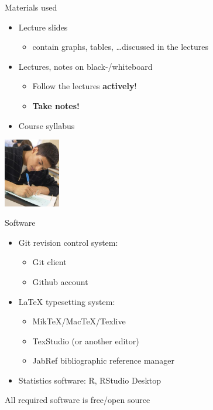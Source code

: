 \documentclass{beamer}
\begin{document}
\begin{frame}{Materials used}

  \begin{itemize}
    \item Lecture slides
      \begin{itemize}
        \item contain graphs, tables, \ldots discussed in the lectures
      \end{itemize}
    \item Lectures, notes on black-/whiteboard
      \begin{itemize}
        \item Follow the lectures \textbf{actively}!
        \item \textbf{Take notes!}
      \end{itemize}
    \item Course syllabus
  \end{itemize}

  
  \begin{center}
    \includegraphics[height=3cm]{img/intro-06.jpg}
  \end{center}

\end{frame}

\begin{frame}{Software}
    
    \begin{itemize}
        \item Git revision control system:
        \begin{itemize}
            \item Git client
            \item Github account
        \end{itemize}
        \item {\LaTeX} typesetting system:
        \begin{itemize}
            \item MikTeX/MacTeX/Texlive
            \item TexStudio (or another editor)
            \item JabRef bibliographic reference manager
        \end{itemize}
        \item Statistics software: R, RStudio Desktop
    \end{itemize}

    \centering
    All required software is free/open source
\end{frame}
\end{document}
